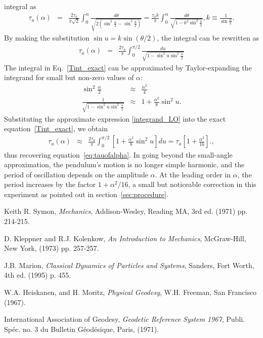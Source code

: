 \documentclass{revtex4}
\begin{document}
integral as
\begin{eqnarray}
  \tau_a(\alpha) &=& \frac{2\tau_a}{\pi\sqrt{2}} \int_{0}^{\alpha}
  \frac{d\theta}{\sqrt{2(\sin^2 \frac{\alpha}{2} - \sin^2
      \frac{\theta}{2} )}} = \frac{\tau_a k}{\pi}
  \int_{0}^{\alpha} \frac{d\theta}{\sqrt{1-k^2 \sin^2
      \frac{\theta}{2}}}, k \equiv \frac{1}{\sin \frac{\alpha}{2}}.
\end{eqnarray}
By making the substitution $\sin u = k \sin (\theta/2)$, the integral
can be rewritten as
\begin{eqnarray}
  \tau_a(\alpha) &=& \frac{2 \tau_a}{\pi} \int_{0}^{\pi/2}
  \frac{du}{\sqrt{1-\sin^2 u \sin^2 \frac{\alpha}{2}}} \label{Tint_exact}
\end{eqnarray}
The integral in Eq.~\eqref{Tint_exact} can be approximated by
Taylor-expanding the integrand for small but non-zero values of $\alpha$:
\begin{eqnarray} 
  \sin^2 \frac{\alpha}{2} &\approx& \frac{\alpha^2}{4}\nonumber \\
  \frac{1}{\sqrt{1-\sin^2 u \sin^2 \frac{\alpha}{2}}} &\approx & 1 +
  \frac{\alpha^2}{8} \sin^2 u. \label{integrand_LO} 
\end{eqnarray}
Substituting the approximate expression \eqref{integrand_LO} into the
exact equation~\eqref{Tint_exact}, we obtain 
\begin{eqnarray}
  \tau_a(\alpha) &\approx& \frac{2\tau_a}{\pi} \int_{0}^{\pi/2} \left[1 + \frac{\alpha^2}{8}
  \sin^2 u \right]du = \tau_a \left[ 1 + \frac{ \alpha^2}{16}
\right]. \label{finiteamplitudecorrection},
\end{eqnarray}
thus recovering equation~\eqref{eq:tauofalpha}. In going beyond the small-angle approximation, the pendulum's motion
is no longer simple harmonic, and the period of oscillation depends on
the amplitude $\alpha$. At the leading order in $\alpha$, the period
increases by the factor $1 + \alpha^2/16$, a small but noticeable
correction in this experiment as pointed out in section~\ref{sec:procedure}.

%

\begin{thebibliography}{9}

 Keith R. Symon,
 \emph{Mechanics},
 Addison-Wesley, Reading MA, 
 3rd ed. (1971) pp. 214-215.

 D. Kleppner and R.J. Kolenkow,
 \emph{An Introduction to Mechanics},
 McGraw-Hill, New York,
 (1973) pp. 257-257.

 J.B. Marion,
 \emph{Classical Dynamics of Particles and Systems},
 Sanders, Fort Worth,
 4th ed. (1995) p. 455.

 W.A. Heiskanen, and H. Moritz,
 \emph{Physical Geodesy},
 W.H. Freeman, San Francisco
 (1967).

 International Association of Geodesy,
 \emph{Geodetic Reference System 1967},
 Publi. Sp\'{e}c. no. 3 du Bulletin G\'{e}od\'{e}sique, Paris,
 (1971).

\end{thebibliography}
\end{document}
